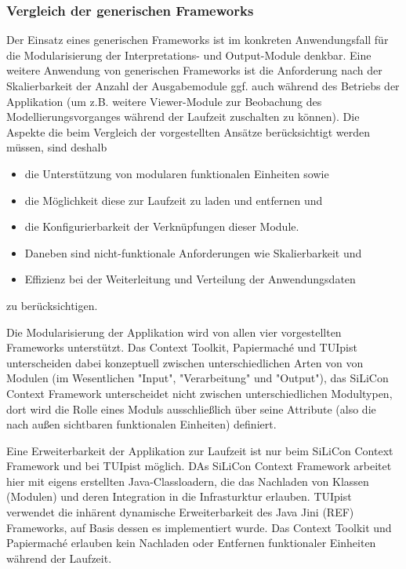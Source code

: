 
\subsubsection{Vergleich der generischen Frameworks}\label{subs:vergleich_generische_frameworks}

Der Einsatz eines generischen Frameworks ist im konkreten Anwendungsfall für die Modularisierung der Interpretations- und Output-Module denkbar. Eine weitere Anwendung von generischen Frameworks ist die Anforderung nach der Skalierbarkeit der Anzahl der Ausgabemodule ggf. auch während des Betriebs der Applikation (um z.B. weitere Viewer-Module zur Beobachung des Modellierungsvorganges während der Laufzeit zuschalten zu können). Die Aspekte die beim Vergleich der vorgestellten Ansätze berücksichtigt werden müssen, sind deshalb
\begin{itemize}
  	\item die Unterstützung von modularen funktionalen Einheiten sowie
	\item die Möglichkeit diese zur Laufzeit zu laden und entfernen und
	\item die Konfigurierbarkeit der Verknüpfungen dieser Module.
	\item Daneben sind nicht-funktionale Anforderungen wie Skalierbarkeit und
	\item Effizienz bei der Weiterleitung und Verteilung der Anwendungsdaten 
\end{itemize}  
zu berücksichtigen.

Die Modularisierung der Applikation wird von allen vier vorgestellten Frameworks unterstützt. Das Context Toolkit, Papiermaché und TUIpist unterscheiden dabei konzeptuell zwischen unterschiedlichen Arten von von Modulen (im Wesentlichen "Input", "Verarbeitung" und "Output"), das SiLiCon Context Framework unterscheidet nicht zwischen unterschiedlichen Modultypen, dort wird die Rolle eines Moduls ausschließlich über seine Attribute (also die nach außen sichtbaren funktionalen Einheiten) definiert.

Eine Erweiterbarkeit der Applikation zur Laufzeit ist nur beim SiLiCon Context Framework und bei TUIpist möglich. DAs SiLiCon Context Framework arbeitet hier mit eigens erstellten Java-Classloadern, die das Nachladen von Klassen (Modulen) und deren Integration in die Infrasturktur erlauben. TUIpist verwendet die inhärent dynamische Erweiterbarkeit des Java Jini (REF) Frameworks, auf Basis dessen es implementiert wurde. Das Context Toolkit und Papiermaché erlauben kein Nachladen oder Entfernen funktionaler Einheiten während der Laufzeit.

